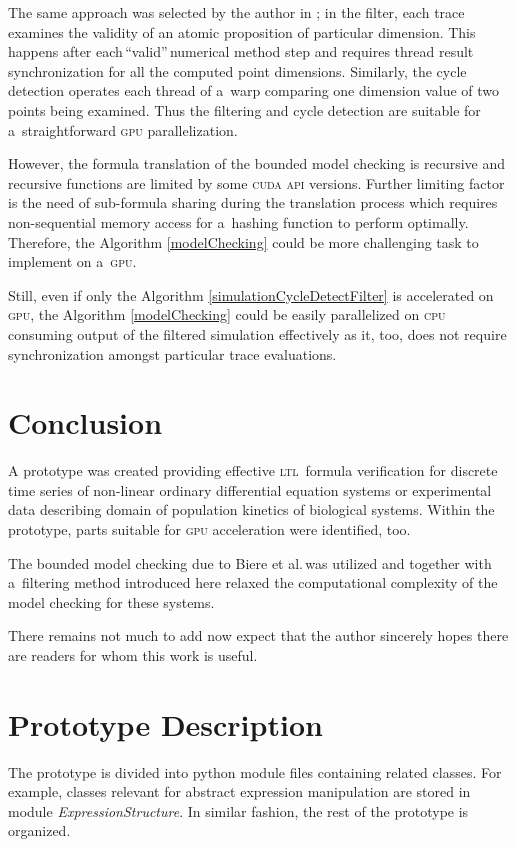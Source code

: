 \documentclass[12pt,twoside,draft]{fithesis}
\newcommand{\ltl}{\textsc{ltl}~}
\begin{document}
The same approach was selected by the author in \cite{me:cuda}; in the
filter, each trace examines the validity of an atomic proposition of
particular dimension. This happens after each\,``valid''\,numerical
method step and requires thread result synchronization for all the
computed point dimensions. Similarly, the cycle detection operates each
thread of a~warp comparing one dimension value of two points being
examined. Thus the filtering and cycle detection are suitable for
a~straightforward \textsc{gpu} parallelization.

However, the formula translation of the bounded model checking is
recursive and recursive functions are limited by some \textsc{cuda}
\textsc{api} versions\cite{cuda:relnotes}. Further limiting factor is
the need of sub-formula sharing during the translation process which
requires non-sequential memory access for a~hashing function to perform
optimally. Therefore, the Algorithm \ref{modelChecking} could be more
challenging task to implement on a~\textsc{gpu}.

Still, even if only the Algorithm \ref{simulationCycleDetectFilter}
is accelerated on \textsc{gpu}, the Algorithm \ref{modelChecking}
could be easily parallelized on \textsc{cpu} consuming output of the
filtered simulation effectively as it, too, does not require
synchronization amongst particular trace evaluations.

\chapter{Conclusion}
A prototype was created providing effective \ltl formula verification
for discrete time series of non-linear ordinary differential equation
systems or experimental data describing domain of population kinetics
of biological systems. Within the prototype, parts suitable for
\textsc{gpu} acceleration were identified, too.

The bounded model checking due to Biere et al.\,was utilized and
together with a~filtering method introduced here relaxed the computational
complexity of the model checking for these systems.

There remains not much to add now expect that the author sincerely hopes
there are readers for whom this work is useful.

\appendix
\chapter{Prototype Description}
The prototype is divided into python module files containing related classes.
For example, classes relevant for abstract expression manipulation are stored
in module \emph{ExpressionStructure}. In similar fashion, the rest of the
prototype is organized.
\end{document}
